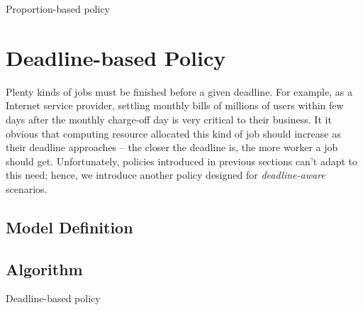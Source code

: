 \begin{algorithm}[H]
  \DontPrintSemicolon %
  
  \caption{Proportion-based policy}
  \label{algo:proportion-based}
\end{algorithm}

\section{Deadline-based Policy}

Plenty kinds of jobs must be finished before a given deadline.
For example, as a Internet service provider, settling monthly bills of
millions of users within few days after the monthly charge-off day is
very critical to their business.
It it obvious that computing resource allocated this kind of job should
increase as their deadline approaches -- the closer the deadline is, the
more worker a job should get.
Unfortunately, policies introduced in previous sections can't adapt to
this need; hence, we introduce another policy designed for
\emph{deadline-aware} scenarios.

\subsection{Model Definition}


\subsection{Algorithm}
\begin{algorithm}[H]
  \DontPrintSemicolon %
  
  \caption{Deadline-based policy}
  \label{algo:deadline-based}
\end{algorithm}
